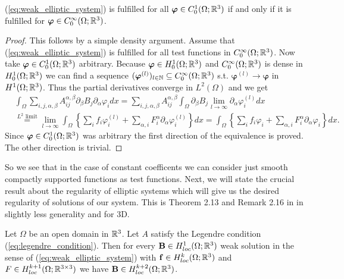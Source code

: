 \documentclass[../main.tex]{subfiles}
\begin{document}
\begin{proposition}\label{prop:weak_solution_smooth_test_functions}
    (\ref{eq:weak_elliptic_system}) is fulfilled for all 
    $\bm{\varphi} \in C^1_0(\Omega;\mathbb{R}^3)$ if and only if it is fulfilled 
    for $\bm{\varphi} \in C^\infty_0(\Omega;\mathbb{R}^3)$.
\end{proposition}
\begin{proof}
    This follows by a simple density argument. Assume that 
    (\ref{eq:weak_elliptic_system}) is fulfilled for all test functions in 
    $C^\infty_0(\Omega;\mathbb{R}^3)$. Now take $\bm{\varphi} \in C^1_0(\Omega;\mathbb{R}^3)$
    arbitrary. Because $\bm{\varphi} \in H_0^1(\Omega;\mathbb{R}^3)$ and 
    $C^\infty_0(\Omega;\mathbb{R}^3)$ is dense in $H_0^1(\Omega;\mathbb{R}^3)$ we can find 
    a sequence $(\bm{\varphi}^{(l)})_{l \in \mathbb{N}} \subseteq 
    C^\infty_0(\Omega;\mathbb{R}^3)$ s.t. $\bm{\varphi}^{(l)} \rightarrow \bm{\varphi}$
    in $H^1(\Omega;\mathbb{R}^3)$. Thus the partial derivatives converge in $L^2(\Omega)$
    and we get
    \begin{align*}
        &\int_\Omega \sum\limits_{i,j,\alpha,\beta} 
            A_{ij}^{\alpha, \beta} \partial_\beta B_j \partial_\alpha \varphi_i
            dx
        = \sum\limits_{i,j,\alpha,\beta} A_{ij}^{\alpha, \beta}
            \int_\Omega \partial_\beta B_j \lim\limits_{l\rightarrow \infty} 
            \partial_\alpha \varphi_i^{(l)} dx
        \\ &\stackrel{\text{$L^2$ limit}}{=} 
            \lim\limits_{l\rightarrow \infty} 
            \int_\Omega \left\{ \sum\limits_i f_i \varphi^{(l)}_i + 
            \sum\limits_{\alpha,i} F_i^\alpha \partial_\alpha \varphi^{(l)}_i 
            \right\} dx
        = \int_\Omega \left\{ \sum\limits_i f_i \varphi_i + 
            \sum\limits_{\alpha,i} F_i^\alpha \partial_\alpha \varphi_i 
            \right\} dx.
    \end{align*}
    Since $\bm{\varphi} \in C_0^1(\Omega;\mathbb{R}^3)$ was arbitrary the first 
    direction of the equivalence is proved. The other direction is trivial.
\end{proof}
So we see that in the case of constant coefficents we can consider 
just smooth compactly supported functions as test functions.
Next, we will state the crucial result about the regularity of elliptic systems
which will give us the desired regularity of solutions of our system. This is Theorem 2.13 and Remark 2.16 
in \cite{lectures_on_elliptic_pdes} in slightly less generality and for 3D.
\begin{theorem}\label{thm:regularity_elliptic_systems}
    Let $\Omega$ be an open domain in $\mathbb{R}^3$. Let $A$ 
    satisfy the Legendre condition (\ref{eq:legendre_condition}). Then for every 
    $\mathbf{B} \in H^1_{loc}(\Omega;\mathbb{R}^3)$ weak solution in the sense of
    (\ref{eq:weak_elliptic_system}) with $\mathbf{f} \in H^k_{loc}(\Omega;\mathbb{R}^3)$ and 
    $F \in H^{k+1}_{loc}(\Omega;\mathbb{R}^{3\times 3})$ 
    we have $\mathbf{B} \in H^{k+2}_{loc}(\Omega;\mathbb{R}^3)$. 
\end{theorem}
\end{document}
